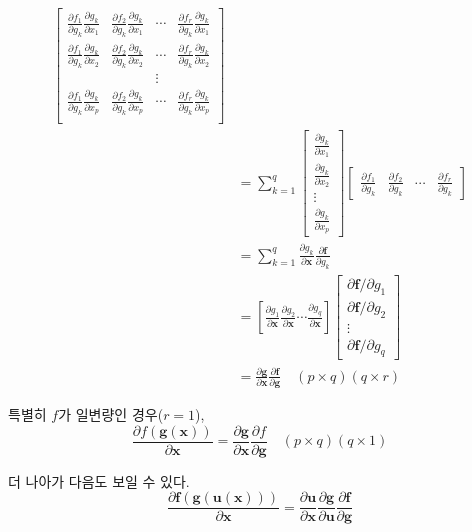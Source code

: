 \documentclass[
]{book}
\newcommand{\pardiff}[2]{\frac{\partial #1}{\partial #2 }}
\newcommand{\pardiffl}[2]{{\partial #1}/{\partial #2 }}
\theoremstyle{definition}
\theoremstyle{definition}
\theoremstyle{definition}
\theoremstyle{remark}
\begin{document}
\begin{align*}
\begin{bmatrix}
 \pardiff{  f_1 }{ g_k} \pardiff{  g_k }{ x_1} & 
   \pardiff{  f_2 }{ g_k} \pardiff{  g_k }{x_1} & \cdots &
   \pardiff{  f_r }{ g_k} \pardiff{  g_k }{x_1}  \\
 \pardiff{  f_1 }{ g_k} \pardiff{  g_k }{ x_2} & 
   \pardiff{  f_2 }{ g_k} \pardiff{  g_k }{x_2} & \cdots &
  \pardiff{  f_r }{ g_k} \pardiff{  g_k }{x_2}  \\
 & & \vdots & \\
 \pardiff{  f_1 }{ g_k} \pardiff{  g_k }{ x_p} & 
   \pardiff{  f_2 }{ g_k} \pardiff{  g_k }{x_p} & \cdots &
   \pardiff{  f_r }{ g_k} \pardiff{  g_k }{x_p}  \\
\end{bmatrix} \\
& = \sum_{k=1}^q
\begin{bmatrix}
\pardiff{  g_k }{ x_1} \\
\pardiff{  g_k }{ x_2} \\
\vdots \\
\pardiff{  g_k }{ x_p}
\end{bmatrix}
\begin{bmatrix}
\pardiff{  f_1 }{ g_k} & \pardiff{  f_2 }{ g_k} & \cdots & \pardiff{  f_r }{ g_k} 
\end{bmatrix} \\
& = \sum_{k=1}^q  \pardiff{  g_k }{\bm x} \pardiff{  \bm f }{ g_k} \\
& = \left [ \pardiff{  g_1 }{\bm x} \pardiff{  g_2 }{\bm x} \cdots \pardiff{  g_q }{\bm x} \right ]
\begin{bmatrix}
\pardiffl{  \bm f }{ g_1} \\
\pardiffl{  \bm f }{ g_2} \\
            \vdots                         \\
\pardiffl{  \bm f }{ g_q} 
\end{bmatrix} \\
&= \pardiff{\bm g} { \bm x} \pardiff{\bm f} { \bm g}  \quad (p \times q)(q \times r)
\end{align*}

특별히 \(f\)가 일변량인 경우(\(r=1\)),
\[ \pardiff{  f(\bm g(\bm x)) }{\bm x}  = \pardiff{\bm g} { \bm x} \pardiff{ f} { \bm g}  \quad (p \times q)(q \times 1) \]

더 나아가 다음도 보일 수 있다.
\[ \pardiff{ \bm f(\bm g(\bm u( \bm x))) }{\bm x}
= \pardiff{\bm u} { \bm x} \pardiff{\bm g} { \bm u}  \pardiff{\bm f} { \bm g} \]

  
\end{document}
